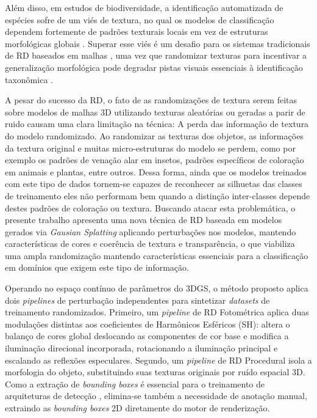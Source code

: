 \documentclass[a4paper,12pt]{article}
\begin{document}
{Além disso, em estudos de biodiversidade, a identificação automatizada de espécies sofre de um viés de textura, no qual os modelos de classificação dependem fortemente de padrões texturais locais em vez de estruturas morfológicas globais \cite{geirhos2018imagenettrained, bjerge2023accurate}. Superar esse viés é um desafio para os sistemas tradicionais de RD baseados em malhas \cite{tobin2017domain, blair2025leveraging}, uma vez que randomizar texturas para incentivar a generalização morfológica pode degradar pistas visuais essenciais à identificação taxonômica \cite{margapuri2021classification}.

A pesar do sucesso da RD, o fato de as randomizações de textura serem feitas sobre modelos de malhas 3D utilizando texturas aleatórias ou geradas a parir de ruido causam uma clara limitação na técnica: A perda das informação de textura do modelo randomizado. Ao randomizar as texturas dos objetos, as informações da textura original e muitas micro-estruturas do modelo se perdem, como por exemplo os padrões de venação alar em insetos, padrões específicos de coloração em animais e plantas, entre outros. Dessa forma, ainda que os modelos treinados com este tipo de dados tornem-se capazes de reconhecer as silhuetas das classes de treinamento eles não performam bem quando a distinção inter-classes depende destes padrões de coloração ou textura. Buscando atacar esta problemática, o presente trabalho apresenta uma nova técnica de RD baseada em modelos gerados via \emph{Gausian Splatting} aplicando perturbações nos modelos, mantendo características de cores e coerência de textura e transparência, o que viabiliza uma ampla randomização mantendo características essenciais para a classificação em domínios que exigem este tipo de informação.

Operando no espaço contínuo de parâmetros do 3DGS, o método proposto aplica dois \emph{pipelines} de perturbação independentes para sintetizar \emph{datasets} de treinamento randomizados. Primeiro, um \emph{pipeline} de RD Fotométrica aplica duas modulações distintas aos coeficientes de Harmônicos Esféricos (SH): altera o balanço de cores global deslocando as componentes de cor base e modifica a iluminação direcional incorporada, rotacionando a iluminação principal e escalando as reflexões especulares. Segundo, um \emph{pipeline} de RD Procedural isola a morfologia do objeto, substituindo suas texturas originais por ruído espacial 3D. Como a extração de \emph{bounding boxes} é essencial para o treinamento de arquiteturas de detecção \cite{deogan2025synthetic, ushiroji2026automatic}, elimina-se também a necessidade de anotação manual, extraindo as \emph{bounding boxes} 2D diretamente do motor de renderização.

}
\end{document}
